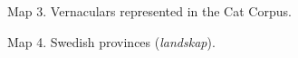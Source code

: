 \begin{figure}[h]
\centering
\begin{minipage}{4.09931in}
\label{bkm:Ref264030993}Map 3. Vernaculars represented in the Cat Corpus.
\end{minipage}
\end{figure}
\clearpage%


\begin{figure}[h]
\centering
\begin{minipage}{5.99722in}
\label{bkm:Ref264031279}Map 4. Swedish provinces (\textit{landskap}).
\end{minipage}
\end{figure}


